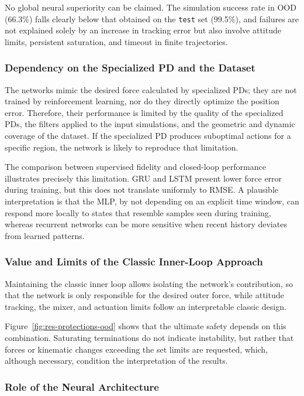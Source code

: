 No global neural superiority can be claimed. The simulation success rate in OOD (66.3\%) falls clearly below that obtained on the \texttt{test} set (99.5\%), and failures are not explained solely by an increase in tracking error but also involve attitude limits, persistent saturation, and timeout in finite trajectories.

\subsubsection*{Dependency on the Specialized PD and the Dataset}

The networks mimic the desired force calculated by specialized PDs; they are not trained by reinforcement learning, nor do they directly optimize the position error. Therefore, their performance is limited by the quality of the specialized PDs, the filters applied to the input simulations, and the geometric and dynamic coverage of the dataset. If the specialized PD produces suboptimal actions for a specific region, the network is likely to reproduce that limitation.

The comparison between supervised fidelity and closed-loop performance illustrates precisely this limitation. GRU and LSTM present lower force error during training, but this does not translate uniformly to RMSE. A plausible interpretation is that the MLP, by not depending on an explicit time window, can respond more locally to states that resemble samples seen during training, whereas recurrent networks can be more sensitive when recent history deviates from learned patterns.

\subsubsection*{Value and Limits of the Classic Inner-Loop Approach}

Maintaining the classic inner loop allows isolating the network's contribution, so that the network is only responsible for the desired outer force, while attitude tracking, the mixer, and actuation limits follow an interpretable classic design.

Figure~\ref{fig:res-protections-ood} shows that the ultimate safety depends on this combination. Saturating terminations do not indicate instability, but rather that forces or kinematic changes exceeding the set limits are requested, which, although necessary, condition the interpretation of the results.

\subsubsection*{Role of the Neural Architecture}

